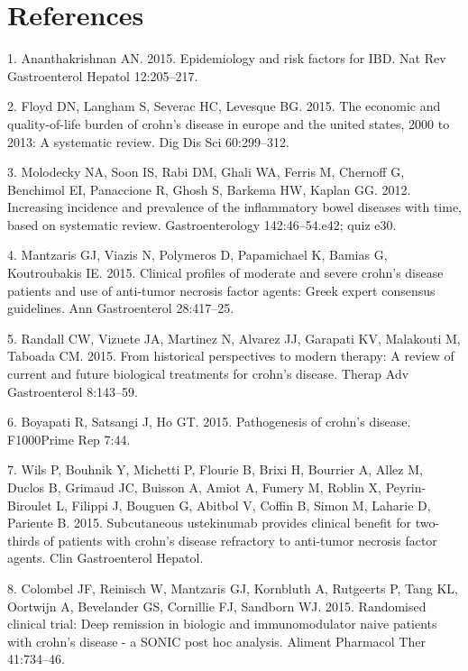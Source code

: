 \documentclass[11pt,]{article}
\begin{document}
\newpage

\section*{References}\label{references}

\hypertarget{refs}{}
\hypertarget{ref-ananthakrishnan_epidemiology_2015}{}
1. Ananthakrishnan AN. 2015. Epidemiology and risk factors for IBD. Nat
Rev Gastroenterol Hepatol 12:205--217.

\hypertarget{ref-floyd_economicburden_2015}{}
2. Floyd DN, Langham S, Severac HC, Levesque BG. 2015. The economic and
quality-of-life burden of crohn's disease in europe and the united
states, 2000 to 2013: A systematic review. Dig Dis Sci 60:299--312.

\hypertarget{ref-molodecky_increasingIBD_2012}{}
3. Molodecky NA, Soon IS, Rabi DM, Ghali WA, Ferris M, Chernoff G,
Benchimol EI, Panaccione R, Ghosh S, Barkema HW, Kaplan GG. 2012.
Increasing incidence and prevalence of the inflammatory bowel diseases
with time, based on systematic review. Gastroenterology 142:46--54.e42;
quiz e30.

\hypertarget{ref-mantzaris_clinical_2015}{}
4. Mantzaris GJ, Viazis N, Polymeros D, Papamichael K, Bamias G,
Koutroubakis IE. 2015. Clinical profiles of moderate and severe crohn's
disease patients and use of anti-tumor necrosis factor agents: Greek
expert consensus guidelines. Ann Gastroenterol 28:417--25.

\hypertarget{ref-randall_CDbiologics_2015}{}
5. Randall CW, Vizuete JA, Martinez N, Alvarez JJ, Garapati KV,
Malakouti M, Taboada CM. 2015. From historical perspectives to modern
therapy: A review of current and future biological treatments for
crohn's disease. Therap Adv Gastroenterol 8:143--59.

\hypertarget{ref-boyapati_pathCD_2015}{}
6. Boyapati R, Satsangi J, Ho GT. 2015. Pathogenesis of crohn's disease.
F1000Prime Rep 7:44.

\hypertarget{ref-wils_ust_2015}{}
7. Wils P, Bouhnik Y, Michetti P, Flourie B, Brixi H, Bourrier A, Allez
M, Duclos B, Grimaud JC, Buisson A, Amiot A, Fumery M, Roblin X,
Peyrin-Biroulet L, Filippi J, Bouguen G, Abitbol V, Coffin B, Simon M,
Laharie D, Pariente B. 2015. Subcutaneous ustekinumab provides clinical
benefit for two-thirds of patients with crohn's disease refractory to
anti-tumor necrosis factor agents. Clin Gastroenterol Hepatol.

\hypertarget{ref-colombel_deepremission_2015}{}
8. Colombel JF, Reinisch W, Mantzaris GJ, Kornbluth A, Rutgeerts P, Tang
KL, Oortwijn A, Bevelander GS, Cornillie FJ, Sandborn WJ. 2015.
Randomised clinical trial: Deep remission in biologic and
immunomodulator naive patients with crohn's disease - a SONIC post hoc
analysis. Aliment Pharmacol Ther 41:734--46.
\end{document}
